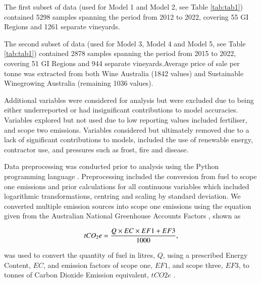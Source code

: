 \documentclass[review,12pt,authoryear]{elsarticle}
\begin{document}
\begin{linenumbers}
\par
The first subset of data (used for Model 1 and Model 2, see Table \ref{tab:tab1}) contained 5298 samples spanning the period from 2012 to 2022, covering 55 GI Regions and 1261 separate vineyards.
\par
The second subset of data (used for Model 3, Model 4 and Model 5, see Table \ref{tab:tab1}) contained 2878 samples spanning the period from 2015 to 2022, covering 51 GI Regions and 944 separate vineyards.Average price of sale per tonne was extracted from both Wine Australia (1842 values) and Sustainable Winegrowing Australia (remaining 1036 values).
\par
Additional variables were considered for analysis but were excluded due to being either underreported or had insignificant contributions to model accuracies. Variables explored but not used due to low reporting values included fertiliser, and scope two emissions. Variables considered but ultimately removed due to a lack of significant contributions to models, included the use of renewable energy, contractor use, and pressures such as frost, fire and disease.
\par
Data preprocessing was conducted prior to analysis using the Python programming language \citep{g.vanrossumPythonTutorialTechnical1995}. Preprocessing included the conversion from fuel to scope one emissions and prior calculations for all continuous variables which included logarithmic transformations, centring and scaling by standard deviation. 
We converted multiple emission sources into scope one emissions using the equation given from the Australian National Greenhouse Accounts Factors \citep{agdeeNationalGreenhouseAccounts2021}, shown as
\par
\begin{equation}
\label{(1)}
    tCO_{2}e={{Q \times EC \times EF1 + EF3}\over{1000}},
\end{equation}
\par
was used to convert the quantity of fuel in litres, $Q$, using a prescribed Energy Content, $EC$, and emission factors of scope one, $EF1$, and scope three, $EF3$, to tonnes of Carbon Dioxide Emission equivalent, $tCO2e$ \citep{departmentofclimatechangeenergytheenvironmentandwaterAustralianNationalGreenhouse2022}.
\par


\end{linenumbers}
\end{document}
